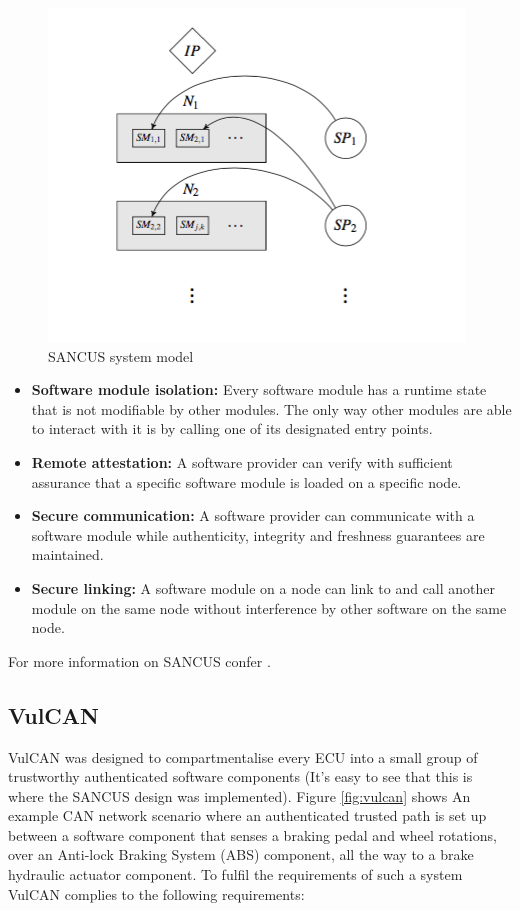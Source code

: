 \documentclass[11pt]{article}
\begin{document}
\begin{figure}[h]
	\caption{SANCUS system model}
	\label{fig:sancus}
	\centering
	\includegraphics[width=\textwidth]{SANCUS}
\end{figure}

\begin{itemize}
	\item \textbf{Software module isolation:} Every software module has a runtime state that is not modifiable by other modules. The only way other modules are able to interact with it is by calling one of its designated entry points.
	\item \textbf{Remote attestation:} A software provider can verify with sufficient assurance that a specific software module is loaded on a specific node.
	\item \textbf{Secure communication:} A software provider can communicate with a software module while authenticity, integrity and freshness guarantees are maintained.
	\item \textbf{Secure linking:} A software module on a node can link to and call another module on the same node without interference by other software on the same node.
\end{itemize}

For more information on SANCUS confer \cite{Sancus}.

\subsection{VulCAN}

VulCAN was designed to compartmentalise every ECU into a small group of trustworthy authenticated software components (It's easy to see that this is where the SANCUS design was implemented). Figure \ref{fig:vulcan} shows An example CAN network scenario where an authenticated trusted path is set up between a software component that senses a braking pedal and wheel rotations, over an Anti-lock Braking System (ABS) component, all the way to a brake hydraulic actuator component. To fulfil the requirements of such a system VulCAN complies to the following requirements:
\end{document}
